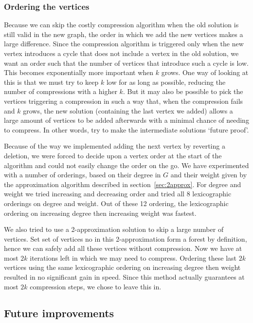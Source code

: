\subsubsection{Ordering the vertices} \label{sec:order}
Because we can skip the costly compression algorithm when the old solution is
still valid in the new graph, the order in which we add the new vertices makes a large difference. Since the compression
algorithm is triggered only when the new vertex introduces a cycle that does not include a vertex in the old solution,
we want an order such that the number of vertices that introduce such a cycle is low. This becomes exponentially more important when $k$ grows. One way of looking at this is that we must try to keep $k$ low for as long as possible, reducing the number of compressions with a higher $k$. But it may also be possible to pick the vertices triggering a compression in such a way that, when the compression fails and $k$ grows, the new solution (containing the last vertex we added) allows a large amount of vertices to be added afterwards with a minimal chance of needing to compress. In other words, try to make the intermediate solutions `future proof'.

Because of the way we implemented adding the next vertex by reverting a deletion, we were forced to decide upon a vertex
order at the start of the algorithm and could not easily change the order on the go. We have experimented with a number of
orderings, based on their degree in $G$ and their weight given by the approximation algorithm described in 
section~\ref{sec:2approx}. For degree and weight we tried increasing and decreasing order and tried
all 8 lexicographic orderings on degree and weight. Out of these 12 ordering, the lexicographic ordering on increasing
degree then increasing weight was fastest.

We also tried to use a 2-approximation solution to skip a large number of vertices. Set set of vertices no in this
2-approximation form a forest by definition, hence we can safely add all these vertices without compression. Now we have
at most $2k$ iterations left in which we may need to compress. Ordering these last $2k$ vertices using the same
lexicographic ordering on increasing degree then weight resulted in no significant gain in speed. Since this method
actually guarantees at most $2k$ compression steps, we chose to leave this in.

\subsection{Future improvements}
